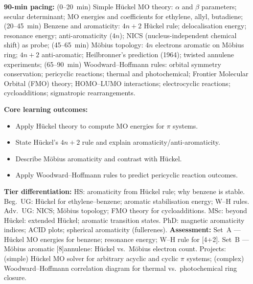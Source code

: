 \documentclass[11pt,a4paper]{article}
\begin{document}
\begin{tcolorbox}[chembox, title={Module~III.3 / L07: H\"uckel and M\"obius Aromaticity}]
\textbf{90-min pacing:} (0--20~min) Simple H\"uckel MO theory: $\alpha$ and $\beta$ parameters; secular determinant; MO energies and coefficients for ethylene, allyl, butadiene; (20--45~min) Benzene and aromaticity: $4n+2$ H\"uckel rule; delocalisation energy; resonance energy; anti-aromaticity ($4n$); NICS (nucleus-independent chemical shift) as probe; (45--65~min) M\"obius topology: $4n$ electrons aromatic on M\"obius ring; $4n+2$ anti-aromatic; Heilbronner's prediction (1964); twisted annulene experiments; (65--90~min) Woodward--Hoffmann rules: orbital symmetry conservation; pericyclic reactions; thermal and photochemical; Frontier Molecular Orbital (FMO) theory; HOMO--LUMO interactions; electrocyclic reactions; cycloadditions; sigmatropic rearrangements.

\medskip\textbf{Core learning outcomes:}
\begin{itemize}[leftmargin=1.4em,topsep=2pt,itemsep=1pt]
  \item Apply H\"uckel theory to compute MO energies for $\pi$ systems.
  \item State H\"uckel's $4n+2$ rule and explain aromaticity/anti-aromaticity.
  \item Describe M\"obius aromaticity and contrast with H\"uckel.
  \item Apply Woodward--Hoffmann rules to predict pericyclic reaction outcomes.
\end{itemize}
\medskip\textbf{Tier differentiation:}
HS: aromaticity from H\"uckel rule; why benzene is stable.
Beg.\ UG: H\"uckel for ethylene--benzene; aromatic stabilisation energy; W--H rules.
Adv.\ UG: NICS; M\"obius topology; FMO theory for cycloadditions.
MSc: beyond H\"uckel: extended H\"uckel; aromatic transition states.
PhD: magnetic aromaticity indices; ACID plots; spherical aromaticity (fullerenes).
\medskip\textbf{Assessment:}
Set~A --- H\"uckel MO energies for benzene; resonance energy; W--H rule for [4+2].
Set~B --- M\"obius aromatic [8]annulene: H\"uckel vs.\ M\"obius electron count.
Projects: (simple) H\"uckel MO solver for arbitrary acyclic and cyclic $\pi$ systems; (complex) Woodward--Hoffmann correlation diagram for thermal vs.\ photochemical ring closure.
\end{tcolorbox}

\medskip
\end{document}
